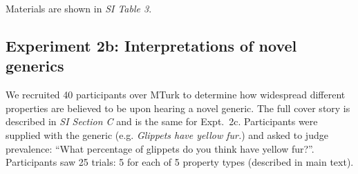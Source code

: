 \documentclass{pnastwo}
\begin{document}
\begin{article}
\begin{materials}
Materials are shown in {\it SI Table 3}.

\subsection{Experiment 2b: Interpretations of novel generics}
We recruited 40 participants over MTurk to determine how widespread different properties are believed to be upon hearing a novel generic.  
The full cover story is described in {\it SI Section C} and is the same for Expt.~2c.
Participants were supplied with the generic (e.g. \emph{Glippets have yellow fur.}) and asked to judge prevalence: ``What percentage of glippets do you think have yellow fur?''. 
Participants saw 25 trials: 5 for each of 5 property types (described in main text).

\end{materials}
\end{article}
\end{document}
